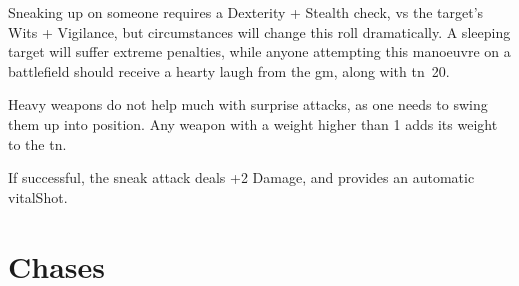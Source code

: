 \begin{multicols}{2}
Sneaking up on someone requires a Dexterity + Stealth check, vs the target's Wits + Vigilance, but circumstances will change this roll dramatically.
A sleeping target will suffer extreme penalties, while anyone attempting this manoeuvre on a battlefield should receive a hearty laugh from the \gls{gm}, along with \gls{tn}~20.

Heavy weapons do not help much with surprise attacks, as one needs to swing them up into position.
Any weapon with a \gls{weight} higher than 1 adds its \gls{weight} to the \gls{tn}.

If successful, the sneak attack deals +2 Damage, and provides an automatic \gls{vitalShot}.

\stopcontents[Manoeuvres]

\end{multicols}

\section{Chases}
\label{chases}

\chasechart

